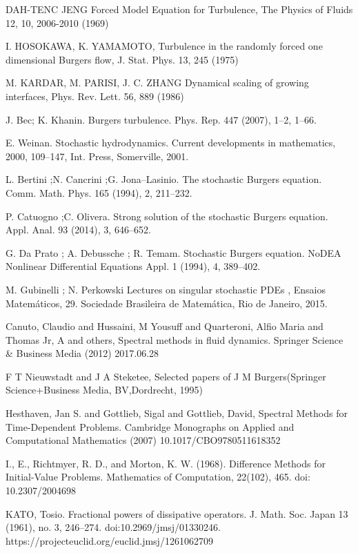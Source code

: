 \begin{thebibliography}{X}
 DAH-TENC JENG Forced Model Equation for Turbulence, The Physics of Fluids 12, 10, 2006-2010 (1969)

 I. HOSOKAWA, K. YAMAMOTO, Turbulence in the randomly forced one dimensional Burgers flow, J. Stat. Phys. 13, 245 (1975)

 M. KARDAR, M. PARISI, J. C. ZHANG Dynamical scaling of growing interfaces, Phys. Rev. Lett. 56, 889 (1986)

 J. Bec; K. Khanin. Burgers turbulence. Phys. Rep. 447 (2007), 1–2, 1–66.

 E. Weinan. Stochastic hydrodynamics. Current developments in mathematics, 2000, 109–147, Int. Press, Somerville, 2001.

 L. Bertini ;N. Cancrini ;G. Jona–Lasinio. The stochastic Burgers equation. Comm. Math. Phys. 165 (1994), 2, 211–232.

 P. Catuogno ;C. Olivera. Strong solution of the stochastic Burgers equation. Appl. Anal. 93 (2014), 3, 646–652.

 G. Da Prato ; A. Debussche ; R. Temam. Stochastic Burgers equation. NoDEA Nonlinear Differential Equations Appl. 1 (1994), 4, 389–402.

 M. Gubinelli ; N. Perkowski Lectures on singular stochastic PDEs , Ensaios Matemáticos, 29. Sociedade Brasileira de Matemática, Rio de
Janeiro, 2015.

 Canuto, Claudio and Hussaini, M Yousuff and Quarteroni, Alfio Maria and Thomas Jr, A and others, Spectral methods in fluid dynamics. Springer Science \& Business Media (2012) 2017.06.28

 F T Nieuwstadt and J A Steketee, Selected papers of J M Burgers(Springer Science+Business Media, BV,Dordrecht, 1995)

 Hesthaven, Jan S. and Gottlieb, Sigal and Gottlieb, David, Spectral Methods for Time-Dependent Problems. Cambridge Monographs on Applied and Computational Mathematics (2007) 10.1017/CBO9780511618352

 I., E., Richtmyer, R. D., and Morton, K. W. (1968). Difference Methods for Initial-Value Problems. Mathematics of Computation, 22(102), 465. doi: 10.2307/2004698

 KATO, Tosio. Fractional powers of dissipative operators. J. Math. Soc. Japan 13 (1961), no. 3, 246--274. doi:10.2969/jmsj/01330246. https://projecteuclid.org/euclid.jmsj/1261062709


\end{thebibliography}
